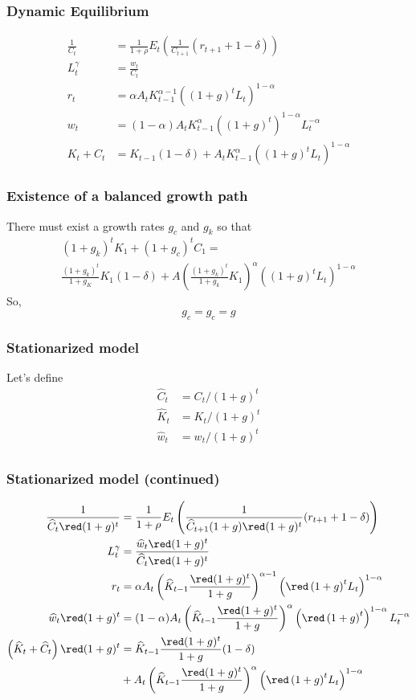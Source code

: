 \documentclass{beamer}
\begin{document}
\begin{frame}
  \frametitle{Dynamic Equilibrium}
  \begin{align*}
    \frac{1}{C_t}&=\frac{1}{1+\rho}E_t\left(\frac{1}{C_{t+1}}(r_{t+1}+1-\delta)\right)\\
    L_t^\gamma&=\frac{w_t}{C_t}\\
    r_t &= \alpha A_tK_{t-1}^{\alpha-1}\left( \left( 1+g\right) ^{t}L_t\right)^{1-\alpha}\\
    w_t &= (1-\alpha) A_tK_{t-1}^\alpha\left( \left( 1+g\right) ^{t}\right)^{1-\alpha}L_t^{-\alpha}\\
    K_t+C_t &= K_{t-1}(1-\delta)+A_tK_{t-1}^\alpha\left( \left( 1+g\right) ^{t}L_t\right)^{1-\alpha}
  \end{align*}
\end{frame}

\begin{frame}
  \frametitle{Existence of a balanced growth path}
  There must exist a growth rates $g_c$ and $g_k$ so that
\begin{multline*}
(1+g_k)^tK_1 + (1+g_c)^tC_1 =\\
 \frac{(1+g_k)^t}{1+g_K}K_1(1-\delta) + A\left(\frac{(1+g_k)^t}{1+g_k}K_1\right)^\alpha\left( \left( 1+g\right) ^{t}L_t\right)^{1-\alpha}
\end{multline*}
So,
\[
g_c=g_c=g
\]
\end{frame}

\begin{frame}
  \frametitle{Stationarized model}
  Let's define
  \begin{align*}
    \widehat{C}_t &= C_t/(1+g)^t\\
    \widehat{K}_t &= K_t/(1+g)^t\\
    \widehat{w}_t &= w_t/(1+g)^t\\
  \end{align*}
\end{frame}

\begin{frame}
  \frametitle{Stationarized model (continued)}
  \begin{align*}
    \frac{1}{\widehat{C}_t{\red(1+g)^t}}&=\frac{1}{1+\rho}E_t\left(\frac{1}{\widehat{C}_{t+1}(1+g){\red(1+g)^t}}(r_{t+1}+1-\delta)\right)\\
    L_t^\gamma&=\frac{\widehat{w}_t{\red(1+g)^t}}{\widehat{C}_t{\red(1+g)^t}}\\
    r_t &= \alpha A_t\left(\widehat{K}_{t-1}\frac{\red(1+g)^t}{1+g}\right)^{\alpha-1}\left( {\red\left( 1+g\right) ^{t}}L_t\right)^{1-\alpha}\\
    \widehat{w}_t{\red(1+g)^t} &= (1-\alpha) A_t\left(\widehat{K}_{t-1}\frac{\red(1+g)^t}{1+g}\right)^\alpha\left( {\red\left( 1+g\right) ^{t}}\right)^{1-\alpha}L_t^{-\alpha}\\
    \left(\widehat{K}_t+\widehat{C}_t\right){\red(1+g)^t} &= \widehat{K}_{t-1}\frac{\red(1+g)^t}{1+g}(1-\delta)\\
&+A_t\left(\widehat{K}_{t-1}\frac{\red(1+g)^t}{1+g}\right)^\alpha\left( {\red\left( 1+g\right) ^{t}}L_t\right)^{1-\alpha}
  \end{align*}
    
\end{frame}
\end{document}
